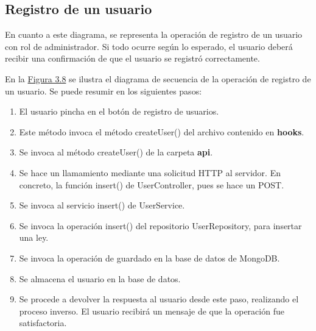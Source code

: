 \subsection{Registro de un usuario}

En cuanto a este diagrama, se representa la operación de registro de un usuario con rol de administrador. Si todo ocurre según lo esperado, el usuario deberá recibir una confirmación de que el usuario se registró correctamente.



En la \hyperref[enlaceDRegistro]{Figura 3.8} se ilustra el diagrama de secuencia de la operación de registro de un usuario. Se puede resumir en los siguientes pasos:

\begin{enumerate}
    \item El usuario pincha en el botón de registro de usuarios.
    \item Este método invoca el método createUser() del archivo contenido en  {\bf hooks}.
    \item Se invoca al método createUser() de la carpeta {\bf api}.
    \item Se hace un llamamiento mediante una solicitud HTTP al servidor. En concreto, la función insert() de UserController, pues se hace un POST.
    \item Se invoca al servicio insert() de UserService.
    \item Se invoca la operación insert() del repositorio UserRepository, para insertar una ley.
    \item Se invoca la operación de guardado en la base de datos de MongoDB.
    \item Se almacena el usuario en la base de datos.
    \item Se procede a devolver la respuesta al usuario desde este paso, realizando el proceso inverso. El usuario recibirá un mensaje de que la operación fue satisfactoria.
\end{enumerate}
